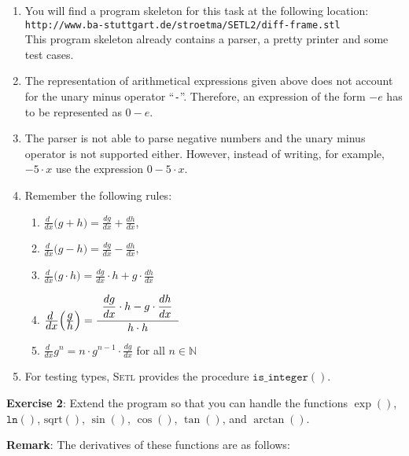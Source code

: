 \documentclass{article}
\newcommand{\diff}{\frac{\displaystyle d\;}{\displaystyle dx}}
\newcommand{\df}[1]{\frac{\displaystyle d#1}{\displaystyle dx}}
\newcommand{\ds}{\displaystyle}
\begin{document}
\noindent
\begin{enumerate}
\item You will find a program skeleton for this task at the following location:
      \\[0.2cm]
      \hspace*{1.3cm}
      \texttt{http://www.ba-stuttgart.de/stroetma/SETL2/diff-frame.stl}
      \\[0.2cm]
      This program skeleton already contains a parser, a pretty printer and some test cases.
\item The representation of arithmetical expressions given above does not account for the unary
      minus operator ``\texttt{-}''.  Therefore, an expression of the form $- e$ has to be
      represented as $0 - e$.
\item The parser is not able to parse negative numbers and the unary minus operator is not supported
      either. However, instead of writing, for example,
      $-5 \cdot x$  use the expression $0 - 5 \cdot x$.  
\item Remember the following rules:
      \begin{enumerate}
      \item $\diff \bigl(g + h\bigr) = \df{g} + \df{h} $,
      \item $\diff \bigl(g - h\bigr) = \df{g} - \df{h} $,
      \item $\diff \bigl(g \cdot h\bigr) = 
       \df{g} \cdot h + g \cdot \df{h}$
      \item $\diff \Bigl(\frac{\ds g}{\ds h}\Bigr) = 
       \frac{\raisebox{-3.3mm}{}\;\;\ds \df{g} \cdot h - g \cdot
         \df{h}\;\;}{\raisebox{3mm}{}\displaystyle h \cdot h}$  
      \item $\diff g^n = n \cdot g^{n-1} \cdot \df{g}$  
            \quad for all $n \in \mathbb{N}$
      \end{enumerate}
\item For testing types, \textsc{Setl} provides the procedure $\texttt{is\_integer}()$.
\end{enumerate}

\noindent
\textbf{Exercise 2}: Extend the program so  that you can handle the functions 
 $\exp()$, $\mathtt{ln}()$, $\mathrm{sqrt}()$, $\sin()$, $\cos()$, $\tan()$, and $\arctan()$.
\vspace{0.3cm}

\noindent
\textbf{Remark}:  The derivatives of these functions are as follows:
\end{document}
